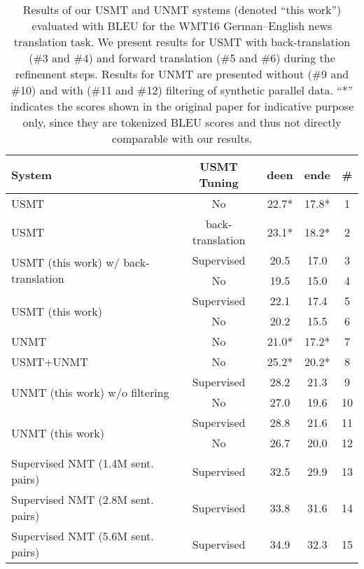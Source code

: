 \documentclass[11pt,a4paper]{article}
\begin{document}
\begin{table*}[t]
\centering
\begin{tabular}{lcccc}
\toprule
 System & USMT Tuning & deen & ende & \# \\ 
\midrule
 \citet{DBLP:journals/corr/abs-1804-07755} USMT & No  & 22.7* & 17.8* & 1\\
 \citet{artetxe2018unsupervised}  USMT    & back-translation & 23.1* & 18.2* & 2 \\
\midrule
\multirow{2}{*}{USMT (this work) w/ back-translation}  & Supervised  & 20.5  & 17.0 & 3\\
 & No   & 19.5  & 15.0  & 4\\ 
 \midrule
\multirow{2}{*}{USMT (this work)}& Supervised  &  22.1 & 17.4 & 5 \\
 & No  & 20.2  &15.5 & 6 \\
 \midrule
\citet{DBLP:journals/corr/abs-1804-07755} UNMT & No & 21.0* & 17.2* & 7\\
\midrule
\citet{DBLP:journals/corr/abs-1804-07755} USMT+UNMT & No  & 25.2* & 20.2* & 8\\
\midrule 
  \multirow{2}{*}{UNMT (this work) w/o filtering } & Supervised   & 28.2  & 21.3 & 9 \\
 & No & 27.0 &19.6  & 10 \\
 \midrule
\multirow{2}{*}{UNMT (this work)} & Supervised  & 28.8  & 21.6 & 11 \\
 & No  & 26.7  & 20.0 & 12\\
\midrule
\midrule
Supervised NMT (1.4M sent. pairs) & Supervised  & 32.5  & 29.9 & 13 \\
Supervised NMT (2.8M sent. pairs) & Supervised  & 33.8  & 31.6 & 14 \\
Supervised NMT (5.6M sent. pairs) & Supervised  & 34.9  & 32.3 & 15 \\
\bottomrule
\end{tabular}
\caption{\label{tab:results} Results of our USMT and UNMT systems (denoted ``this work'') evaluated with BLEU for the WMT16 German--English news translation task.  We present results for USMT with back-translation (\#3 and \#4) and forward translation (\#5 and \#6) during the refinement steps. Results for UNMT are presented without (\#9 and \#10) and with (\#11 and \#12) filtering of synthetic parallel data. ``*'' indicates the scores shown in the original paper for indicative purpose only, since they are tokenized BLEU scores and thus not directly comparable with our results.}
\end{table*}
\end{document}
